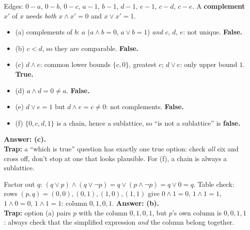 \documentclass{fkt-notes}
\theoremstyle{definition}
\begin{document}
\begin{example}\leavevmode
  \begin{center}
  \end{center}
  Edges: $0\!-\!a$, $0\!-\!b$, $0\!-\!c$, $a\!-\!1$, $b\!-\!1$, $d\!-\!1$, $e\!-\!1$, $c\!-\!d$, $c\!-\!e$.
  A \textbf{complement} $x'$ of $x$ needs \emph{both} $x\wedge x'=0$ and
  $x\vee x'=1$.
  \begin{itemize}[nosep]
    \item (a) complements of $b$: $a$ ($a\wedge b=0$, $a\vee b=1$) \emph{and} $c$, $d$, $e$: not unique. \textbf{False.}
    \item (b) $c<d$, so they are comparable. \textbf{False.}
    \item (c) $d\wedge e$: common lower bounds $\{c,0\}$, greatest $c$; $d\vee e$: only upper bound $1$. \textbf{True.}
    \item (d) $a\wedge d=0\ne a$. \textbf{False.}
    \item (e) $d\vee e=1$ but $d\wedge e=c\neq0$: not complements. \textbf{False.}
    \item (f) $\{0,c,d,1\}$ is a chain, hence a sublattice, so ``is not a sublattice'' is \textbf{false.}
  \end{itemize}
  \textbf{Answer: (c).}\\
  \textbf{Trap:} a ``which is true'' question has exactly one true option:
  check \emph{all} six and cross off, don't stop at one that looks plausible.
  For (f), a chain is always a sublattice.
\end{example}

\begin{example}
  Factor out $q$: $(q\vee p)\wedge(q\vee\neg p)=q\vee(p\wedge\neg p)=q\vee0=q$.
  Table check: rows $(p,q)=(0,0),(0,1),(1,0),(1,1)$ give
  $0\wedge1=0$, $1\wedge1=1$, $1\wedge0=0$, $1\wedge1=1$: column
  $0,1,0,1$. \textbf{Answer: (b).}\\
  \textbf{Trap:} option (a) pairs $p$ with the column $0,1,0,1$, but $p$'s
  own column is $0,0,1,1$: always check that the simplified expression
  \emph{and} the column belong together.
\end{example}
\end{document}
